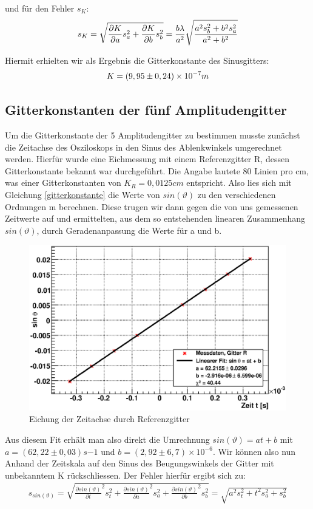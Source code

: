 \documentclass[12pt]{article}
\begin{document}
und für den Fehler $s_K$:
\begin{align}
\notag
 s_K=\sqrt{\frac{\partial K}{\partial a}s_a^2+\frac{\partial K}{\partial b}s_b^2}=\frac{b\lambda}{a^2}\sqrt{\frac{a^2s_b^2+b^2s_a^2}{a^2+b^2}}
\end{align}

Hiermit erhielten wir als Ergebnis die Gitterkonstante des Sinusgitters:
\begin{align}
\notag
 K=(9,95\pm0,24)\times10^{-7}m
\end{align}
\subsection{Gitterkonstanten der fünf Amplitudengitter}
Um die Gitterkonstante der 5 Amplitudengitter zu bestimmen musste zunächst die Zeitachse des Osziloskops in den Sinus des Ablenkwinkels umgerechnet werden. Hierfür wurde eine Eichmessung mit einem Referenzgitter R, dessen Gitterkonstante bekannt war durchgeführt. Die Angabe lautete 80 Linien pro cm, was einer Gitterkonstanten von $K_R=0,0125cm$ entspricht. Also lies sich mit Gleichung \ref{gitterkonstante} die Werte von $sin(\vartheta)$ zu den verschiedenen Ordnungen m berechnen. Diese trugen wir dann gegen die von uns gemessenen Zeitwerte auf und ermittelten, aus dem so entstehenden linearen Zusammenhang $sin(\vartheta)$, durch Geradenanpassung die Werte für a und b.

\begin{figure}[H]  
\centering
\includegraphics[width=0.7\linewidth]{pictures/r.eps}
\caption{Eichung der Zeitachse durch Referenzgitter}
\end{figure}

Aus diesem Fit erhält man also direkt die Umrechnung $sin(\vartheta)=at+b$ mit $a=(62,22\pm 0,03)s{-1}$ und $b=(2,92\pm 6,7)\times 10^{-6}$. Wir können also nun Anhand der Zeitskala auf den Sinus des Beugungswinkels der Gitter mit unbekanntem K rückschliessen. Der Fehler hierfür ergibt sich zu:
\begin{align}
 s_{sin(\vartheta)} = \sqrt{\frac{\partial sin(\vartheta)}{\partial t}^2s_t^2 + \frac{\partial sin(\vartheta)}{\partial a}^2s_a^2 + \frac{\partial sin(\vartheta)}{\partial b}^2s_b^2} = \sqrt{a^2s_t^2+t^2s_a^2+s_b^2}
\end{align}
\end{document}

